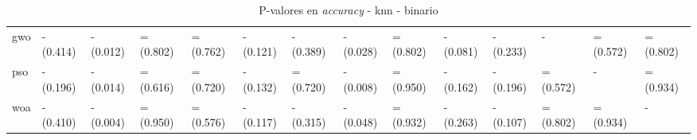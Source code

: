 \begin{table}
\begin{adjustbox}{width=\linewidth}
\begin{tabular}{llllllllllllll}
            gwo   & - (0.414) & - (0.012) & = (0.802) & = (0.762) & - (0.121) & - (0.389) & - (0.028) & = (0.802) & - (0.081) & - (0.233) & -         & = (0.572) & = (0.802) \\
            pso   & - (0.196) & - (0.014) & = (0.616) & = (0.720) & - (0.132) & = (0.720) & - (0.008) & = (0.950) & - (0.162) & - (0.196) & = (0.572) & -         & = (0.934) \\
            woa   & - (0.410) & - (0.004) & = (0.950) & = (0.576) & - (0.117) & - (0.315) & - (0.048) & = (0.932) & - (0.263) & - (0.107) & = (0.802) & = (0.934) & -         \\
            \bottomrule
        \end{tabular}
    \end{adjustbox}
    \caption{P-valores en \textit{accuracy} - knn - binario}
    \label{tab:p-values_accuracy_bin_knn}
\end{table}

